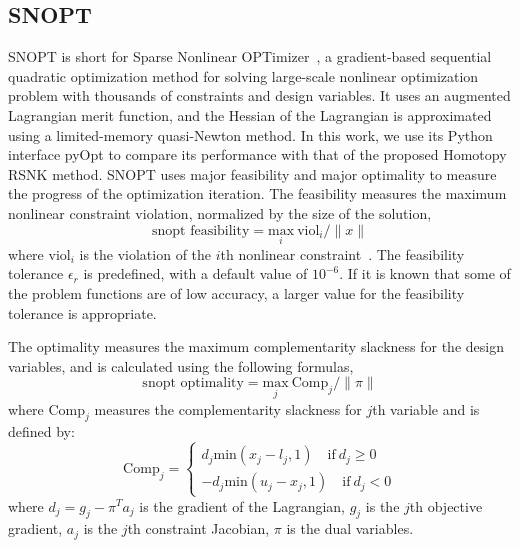\subsection{SNOPT}
SNOPT is short for Sparse Nonlinear OPTimizer~\cite{gill:2002}, a gradient-based sequential 
quadratic optimization method for solving large-scale nonlinear optimization problem 
with thousands of constraints and design variables. It uses an augmented Lagrangian 
merit function, and the Hessian of the Lagrangian is approximated
using a limited-memory quasi-Newton method. In this work, we use its Python interface 
pyOpt to compare its performance with that of the proposed Homotopy RSNK method. 
SNOPT uses major feasibility and major optimality to measure the progress of the 
optimization iteration. The feasibility measures the maximum nonlinear constraint violation, 
normalized by the size of the solution,
\begin{equation*}
\text{snopt feasibility} = \underset{i}{\text{max}}  \ \text{viol}_i / \lVert x \rVert 
\end{equation*}
where $\text{viol}_i$ is the violation of the $i$th nonlinear constraint~\cite{snopt_manual}. The feasibility tolerance 
$\epsilon_r$ is predefined, with a default value of $10^{-6}$. If it is known that some of the problem 
functions are of low accuracy, a larger value for the feasibility tolerance is appropriate. 

The optimality measures the maximum complementarity slackness for the design variables, 
and is calculated using the following formulas, 
\begin{equation*}
\text{snopt optimality} = \underset{j}{\text{max}}  \ \text{Comp}_j / \lVert \pi \rVert 
\end{equation*}
where $\text{Comp}_j$ measures the complementarity slackness for $j$th variable and is defined by:
\begin{equation*}
\text{Comp}_j = \begin{cases}
d_j \text{min} (x_j - l_j, 1)  \quad \text{if} \ d_j \geq 0 \\
-d_j \text{min} (u_j - x_j, 1) \quad \text{if} \ d_j < 0
\end{cases}
\end{equation*}
where $d_j = g_j - \pi^T a_j$ is the gradient of the Lagrangian, $g_j$ is the $j$th objective gradient, 
$a_j$ is the $j$th constraint Jacobian, $\pi$ is the dual variables. 

